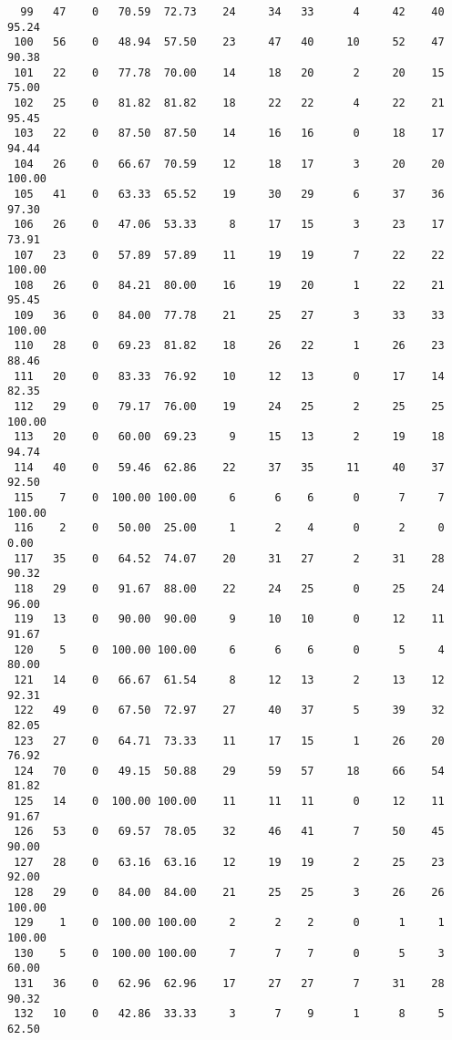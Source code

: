 \begin{verbatim}
  99   47    0   70.59  72.73    24     34   33      4     42    40    95.24
 100   56    0   48.94  57.50    23     47   40     10     52    47    90.38
 101   22    0   77.78  70.00    14     18   20      2     20    15    75.00
 102   25    0   81.82  81.82    18     22   22      4     22    21    95.45
 103   22    0   87.50  87.50    14     16   16      0     18    17    94.44
 104   26    0   66.67  70.59    12     18   17      3     20    20   100.00
 105   41    0   63.33  65.52    19     30   29      6     37    36    97.30
 106   26    0   47.06  53.33     8     17   15      3     23    17    73.91
 107   23    0   57.89  57.89    11     19   19      7     22    22   100.00
 108   26    0   84.21  80.00    16     19   20      1     22    21    95.45
 109   36    0   84.00  77.78    21     25   27      3     33    33   100.00
 110   28    0   69.23  81.82    18     26   22      1     26    23    88.46
 111   20    0   83.33  76.92    10     12   13      0     17    14    82.35
 112   29    0   79.17  76.00    19     24   25      2     25    25   100.00
 113   20    0   60.00  69.23     9     15   13      2     19    18    94.74
 114   40    0   59.46  62.86    22     37   35     11     40    37    92.50
 115    7    0  100.00 100.00     6      6    6      0      7     7   100.00
 116    2    0   50.00  25.00     1      2    4      0      2     0     0.00
 117   35    0   64.52  74.07    20     31   27      2     31    28    90.32
 118   29    0   91.67  88.00    22     24   25      0     25    24    96.00
 119   13    0   90.00  90.00     9     10   10      0     12    11    91.67
 120    5    0  100.00 100.00     6      6    6      0      5     4    80.00
 121   14    0   66.67  61.54     8     12   13      2     13    12    92.31
 122   49    0   67.50  72.97    27     40   37      5     39    32    82.05
 123   27    0   64.71  73.33    11     17   15      1     26    20    76.92
 124   70    0   49.15  50.88    29     59   57     18     66    54    81.82
 125   14    0  100.00 100.00    11     11   11      0     12    11    91.67
 126   53    0   69.57  78.05    32     46   41      7     50    45    90.00
 127   28    0   63.16  63.16    12     19   19      2     25    23    92.00
 128   29    0   84.00  84.00    21     25   25      3     26    26   100.00
 129    1    0  100.00 100.00     2      2    2      0      1     1   100.00
 130    5    0  100.00 100.00     7      7    7      0      5     3    60.00
 131   36    0   62.96  62.96    17     27   27      7     31    28    90.32
 132   10    0   42.86  33.33     3      7    9      1      8     5    62.50

\end{verbatim}
